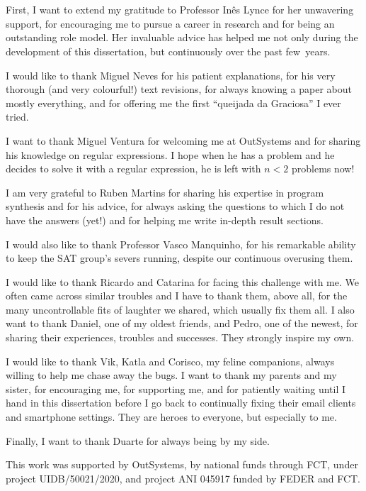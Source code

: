 \section*{\acknowledgments}


First, I want to extend my gratitude to Professor Inês Lynce for her unwavering support, for encouraging me to pursue a career in research and for being an outstanding role model. Her invaluable advice has helped me not only during the development of this dissertation, but continuously over the past few~years.

I would like to thank Miguel Neves for his patient explanations, for his very thorough (and very colourful!) text revisions, for always knowing a paper about mostly everything, and for offering me the first “queijada da Graciosa” I ever tried.

I want to thank Miguel Ventura for welcoming me at OutSystems and for sharing his knowledge on regular expressions. I hope when he has a problem and he decides to solve it with a regular expression, he is left with \(n < 2\) problems now!

I am very grateful to Ruben Martins for sharing his expertise in program synthesis and for his advice, for always asking the questions to which I do not have the answers (yet!) and for helping me write in-depth result sections.

I would also like to thank Professor Vasco Manquinho, for his remarkable ability to keep the SAT group's severs running, despite our continuous overusing them.

I would like to thank Ricardo and Catarina for facing this challenge with me. We often came across similar troubles and I have to thank them, above all, for the many uncontrollable fits of laughter we shared, which usually fix them all.
%
I also want to thank Daniel, one of my oldest friends, and Pedro, one of the newest, for sharing their experiences, troubles and successes. They strongly inspire my own.

I would like to thank Vik, Katla and Corisco, my feline companions, always willing to help me chase away the bugs.
%
I want to thank my parents and my sister, for encouraging me, for supporting me, and for patiently waiting until I hand in this dissertation before I go back to continually fixing their email clients and smartphone settings.  They are heroes to everyone, but especially to me.

Finally, I want to thank Duarte for always being by my side.

\bigskip
This work was supported by OutSystems, by national funds through FCT, under project UIDB/50021/2020, and project ANI 045917 funded by FEDER and FCT.

\cleardoublepage